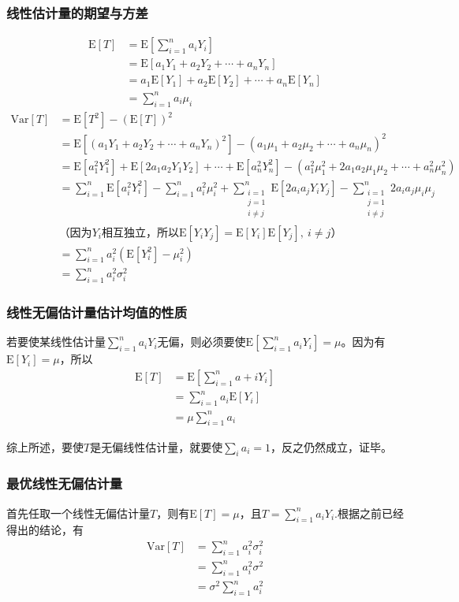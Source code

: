 \documentclass[UTF8]{ctexbook}
\begin{document}
\subsubsection{线性估计量的期望与方差}
\label{proof2}
\begin{align*}
	\mathrm{E}[T]&=\mathrm{E}[\sum_{i=1}^na_iY_i]\\
	&=\mathrm{E}[a_1Y_1+a_2Y_2+\cdots+a_nY_n]\\
	&=a_1\mathrm{E}[Y_1]+a_2\mathrm{E}[Y_2]+\cdots+a_n\mathrm{E}[Y_n]\\
	&=\sum_{i=1}^na_i\mu_i
\end{align*}
\begin{align*}
	\mathrm{Var}[T]&=\mathrm{E}[T^2]-(\mathrm{E}[T])^2\\
	&=\mathrm{E}[(a_1Y_1+a_2Y_2+\cdots+a_nY_n)^2]-(a_1\mu_1+a_2\mu_2+\cdots+a_n\mu_n)^2\\
	&=\mathrm{E}[a_1^2Y_1^2]+\mathrm{E}[2a_1a_2Y_1Y_2]+\cdots+\mathrm{E}[a_n^2Y_n^2]-(a_1^2\mu_1^2+2a_1a_2\mu_1\mu_2+\cdots+a_n^2\mu_n^2)\\
	&=\sum_{i=1}^n\mathrm{E}[a_i^2Y_i^2]-\sum_{i=1}^na_i^2\mu_i^2+\sum_{\substack{i=1\\j=1\\i\neq j}}^n\mathrm{E}[2a_ia_jY_iY_j]-\sum_{\substack{i=1\\j=1\\i\neq j}}^n2a_ia_j\mu_i\mu_j\\
	&\text{（因为$Y_i$相互独立，所以$\mathrm{E}[Y_iY_j]=\mathrm{E}[Y_i]\mathrm{E}[Y_j],\ i\neq j$）}\\
	&=\sum_{i=1}^na_i^2(\mathrm{E}[Y_i^2]-\mu_i^2)\\
	&=\sum_{i=1}^na_i^2\sigma_i^2
\end{align*}
\subsubsection{线性无偏估计量估计均值的性质}
\label{proof3}
若要使某线性估计量$\sum_{i=1}^na_iY_i$无偏，则必须要使$\mathrm{E}[\sum_{i=1}^na_iY_i]=\mu$。因为有$\mathrm{E}[Y_i]=\mu$，所以
\begin{align*}
	\mathrm{E}[T]&=\mathrm{E}[\sum_{i=1}^na+iY_i]\\
	&=\sum_{i=1}^na_i\mathrm{E}[Y_i]\\
	&=\mu\sum_{i=1}^na_i
\end{align*}

综上所述，要使$T$是无偏线性估计量，就要使$\sum_{i}a_i=1$，反之仍然成立，证毕。
\subsubsection{最优线性无偏估计量}
\label{proof4}
首先任取一个线性无偏估计量$T$，则有$\mathrm{E}[T]=\mu$，且$T=\sum_{i=1}^na_iY_i$.根据之前已经得出的结论，有
\begin{align*}
	\mathrm{Var}[T]&=\sum_{i=1}^na_i^2\sigma_i^2\\
	&=\sum_{i=1}^na_i^2\sigma^2\\
	&=\sigma^2\sum_{i=1}^na_i^2\\
\end{align*}
\end{document}
